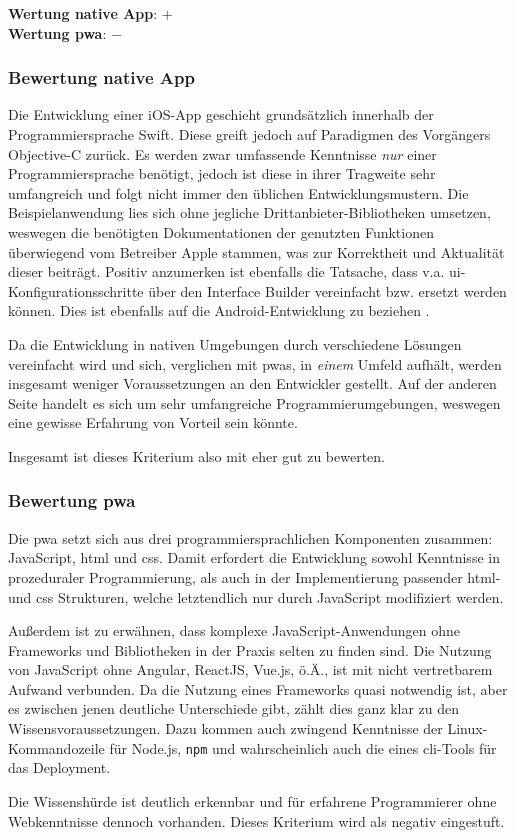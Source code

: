 \textbf{Wertung native App}: $+$ \\
\textbf{Wertung \ac{pwa}}: $-$\\

\subsubsection{Bewertung native App}
Die Entwicklung einer iOS-App geschieht grundsätzlich innerhalb der Programmiersprache Swift. Diese greift jedoch auf Paradigmen des Vorgängers Objective-C zurück. Es werden zwar umfassende Kenntnisse \textit{nur} einer Programmiersprache benötigt, jedoch ist diese in ihrer Tragweite sehr umfangreich und folgt nicht immer den üblichen Entwicklungsmustern. Die Beispielanwendung lies sich ohne jegliche Drittanbieter-Bibliotheken umsetzen, weswegen die benötigten Dokumentationen der genutzten Funktionen überwiegend vom Betreiber Apple stammen, was zur Korrektheit und Aktualität dieser beiträgt. Positiv anzumerken ist ebenfalls die Tatsache, dass v.a. \ac{ui}-Konfigurationsschritte über den Interface Builder vereinfacht bzw. ersetzt werden können. Dies ist ebenfalls auf die Android-Entwicklung zu beziehen \cite{AndroidStudio}.

Da die Entwicklung in nativen Umgebungen durch verschiedene Lösungen vereinfacht wird und sich, verglichen mit \acp{pwa}, in \textit{einem} Umfeld aufhält, werden insgesamt weniger Voraussetzungen an den Entwickler gestellt. Auf der anderen Seite handelt es sich um sehr umfangreiche Programmierumgebungen, weswegen eine gewisse Erfahrung von Vorteil sein könnte. 

Insgesamt ist dieses Kriterium also mit eher gut zu bewerten.

\subsubsection{Bewertung \ac{pwa}}
Die \ac{pwa} setzt sich aus drei programmiersprachlichen Komponenten zusammen: JavaScript, \ac{html} und \ac{css}. Damit erfordert die Entwicklung sowohl Kenntnisse in prozeduraler Programmierung, als auch in der Implementierung passender \ac{html}- und \ac{css} Strukturen, welche letztendlich nur durch JavaScript modifiziert werden.

Außerdem ist zu erwähnen, dass komplexe JavaScript-Anwendungen ohne Frameworks und Bibliotheken in der Praxis selten zu finden sind. Die Nutzung von JavaScript ohne Angular, ReactJS, Vue.js, ö.Ä., ist mit nicht vertretbarem Aufwand verbunden. Da die Nutzung eines Frameworks quasi notwendig ist, aber es zwischen jenen deutliche Unterschiede gibt, zählt dies ganz klar zu den Wissensvoraussetzungen. Dazu kommen auch zwingend Kenntnisse der Linux-Kommandozeile für Node.js, \texttt{npm} und wahrscheinlich auch die eines \ac{cli}-Tools für das Deployment.

Die Wissenshürde ist deutlich erkennbar und für erfahrene Programmierer ohne Webkenntnisse dennoch vorhanden. Dieses Kriterium wird als negativ eingestuft.  